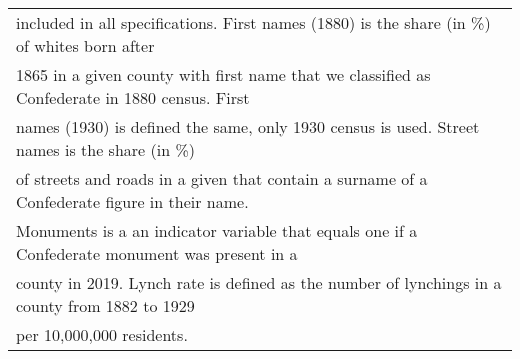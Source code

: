 \begin{table}
\begin{tabular}[t]{lccccc}
\multicolumn{6}{l}{included in all specifications. First names (1880) is the share (in \%) of whites born after}\\
\multicolumn{6}{l}{1865 in a given county with first name that we classified as Confederate in 1880 census. First}\\
\multicolumn{6}{l}{names (1930) is defined the same, only 1930 census is used. Street names is the share (in \%)}\\
\multicolumn{6}{l}{of streets and roads in a given that contain a surname of a Confederate figure in their name.}\\
\multicolumn{6}{l}{Monuments is a an indicator variable that equals one if a Confederate monument was present in a}\\
\multicolumn{6}{l}{county in 2019. Lynch rate is defined as the number of lynchings in a county from 1882 to 1929}\\
\multicolumn{6}{l}{per 10,000,000 residents.}\\
\end{tabular}
\end{table}
